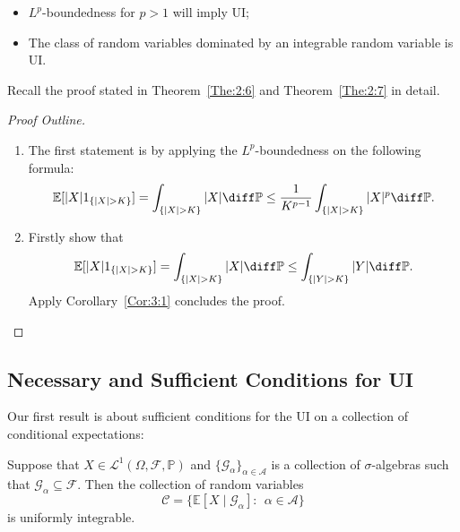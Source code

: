 \begin{proposition}
\begin{itemize}
\item
$L^p$-boundedness for $p>1$ will imply UI;
\item
The class of random variables dominated by an integrable random variable is UI.
\end{itemize}
\end{proposition}
Recall the proof stated in Theorem~\ref{The:2:6} and Theorem~\ref{The:2:7} in detail.
\begin{proof}[Proof Outline]
\begin{enumerate}
\item
The first statement is by applying the $L^p$-boundedness on the following formula:
\[
\mathbb{E}[|X|1_{\{|X|>K\}}]
=
\int_{\{|X|>K\}}|X|\diff\mathbb{P}
\le \frac{1}{K^{p-1}}\int_{\{|X|>K\}}|X|^p\diff\mathbb{P}.
\]
\item
Firstly show that
\[
\mathbb{E}[|X|1_{\{|X|>K\}}]
=
\int_{\{|X|>K\}}|X|\diff\mathbb{P}\le \int_{\{|Y|>K\}}|Y|\diff\mathbb{P}.
\]
Apply Corollary~\ref{Cor:3:1} concludes the proof.
\end{enumerate}
\end{proof}



\subsection{Necessary and Sufficient Conditions for UI}

Our first result is about sufficient conditions for the UI on a collection of conditional expectations:

\begin{theorem}\label{The:UI:condition}
Suppose that $X\in\mathcal{L}^1(\Omega,\mathcal{F},\mathbb{P})$ and $\{\mathcal{G}_{\alpha}\}_{\alpha\in\mathcal{A}}$ is a collection of $\sigma$-algebras such that $\mathcal{G}_{\alpha}\subseteq\mathcal{F}$.
Then the collection of random variables 
\[
\mathcal{C} = \bigg\{
\mathbb{E}[X\mid\mathcal{G}_{\alpha}]:~~\alpha\in\mathcal{A}
\bigg\}
\]
is uniformly integrable.
\end{theorem}

